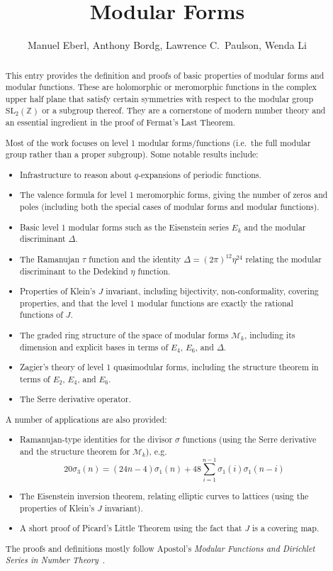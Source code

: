 \documentclass[11pt,a4paper]{article}
\begin{document}
\title{Modular Forms}
\author{Manuel Eberl, Anthony Bordg, Lawrence C.\ Paulson, Wenda Li}
\maketitle

\begin{abstract}
This entry provides the definition and proofs of basic properties of
modular forms and modular functions. 
These are holomorphic or meromorphic functions in the complex upper half 
plane that satisfy certain symmetries with respect to the modular group 
$\text{SL}_2(\mathbb{Z})$ or a subgroup thereof. They are a cornerstone
of modern number theory and an essential ingredient in the proof of
Fermat's Last Theorem.

Most of the work focuses on level 1 modular forms/functions (i.e.\ the
full modular group rather than a proper subgroup). Some notable results include:
\begin{itemize}
  \item Infrastructure to reason about $q$-expansions of periodic functions.
  \item The valence formula for level 1 meromorphic forms, giving the number of zeros and poles (including both the special cases of modular forms and modular functions).
  \item Basic level 1 modular forms such as the Eisenstein series $E_k$ and the modular discriminant $\Delta$.
  \item The Ramanujan $\tau$ function and the identity $\Delta = (2\pi)^{12}\eta^24$ relating the modular discriminant to the Dedekind $\eta$ function.
  \item Properties of Klein's $J$ invariant, including bijectivity, non-conformality, covering properties, and that the level 1 modular functions are exactly the rational functions of $J$.
  \item The graded ring structure of the space of modular forms $\mathcal M_k$, including its dimension and explicit bases in terms of $E_4$, $E_6$, and $\Delta$.
  \item Zagier's theory of level 1 quasimodular forms, including the structure theorem in terms of $E_2$, $E_4$, and $E_6$.
  \item The Serre derivative operator.
\end{itemize}
A number of applications are also provided:
\begin{itemize}
  \item Ramanujan-type identities for the divisor $\sigma$ functions (using the Serre derivative and the structure theorem for $\mathcal M_k$), e.g.
  \[20 \sigma_3(n) = (24 n - 4) \sigma_1(n) + 48\sum_{i=1}^{n-1} \sigma_1(i) \sigma_1(n-i)\]
  \item The Eisenstein inversion theorem, relating elliptic curves to lattices (using the properties of Klein's $J$ invariant).
  \item A short proof of Picard's Little Theorem using the fact that $J$ is a covering map.
\end{itemize}
The proofs and definitions mostly follow Apostol's 
\emph{Modular Functions and Dirichlet Series in Number Theory}~\cite{apostol}.
\end{abstract}
\end{document}
